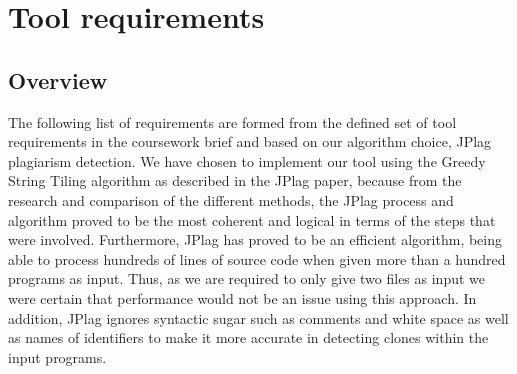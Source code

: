 \section{Tool requirements}

\subsection{Overview}
The following list of requirements are formed from the defined set of tool requirements in the coursework brief and based on our algorithm choice, JPlag plagiarism detection.
We have chosen to implement our tool using the Greedy String Tiling algorithm as described in the JPlag paper, because from the research and comparison of the different methods, the JPlag process and algorithm proved to be the most coherent and logical in terms of the steps that were involved. Furthermore, JPlag has proved to be an efficient algorithm, being able to process hundreds of lines of source code when given more than a hundred programs as input. Thus, as we are required to only give two files as input we were certain that performance would not be an issue using this approach. In addition, JPlag ignores syntactic sugar such as comments and white space as well as names of identifiers to make it more accurate in detecting clones within the input programs.
